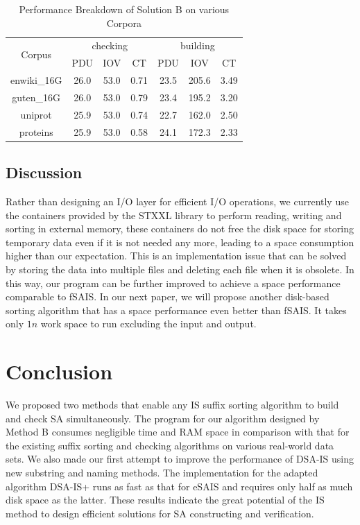 \documentclass[10pt,journal,compsoc]{IEEEtran}
\begin{document}
\begin{table}%
	\caption{Performance Breakdown of Solution B on various Corpora}
	\label{tbl:breakdown_solutionb}
	\centering
	\begin{tabular}{|c|c|c|c|c|c|c|}
		\hline
		\multirow{2}{*}{Corpus} & \multicolumn{3}{|c}{checking} & \multicolumn{3}{|c|}{building} \\\cline{2-7}
		& PDU & IOV & CT & PDU & IOV & CT \\\hline
		enwiki\_16G & 26.0 & 53.0 & 0.71 & 23.5 & 205.6 & 3.49 \\\hline
		guten\_16G & 26.0 & 53.0 & 0.79 & 23.4 & 195.2 & 3.20 \\\hline
		uniprot & 25.9 & 53.0 & 0.74 & 22.7 & 162.0 & 2.50 \\\hline
		proteins & 25.9 & 53.0 & 0.58 & 24.1 & 172.3 & 2.33 \\\hline
	\end{tabular}
\end{table}%

\subsection{Discussion}

Rather than designing an I/O layer for efficient I/O operations, we currently use the containers provided by the STXXL library to perform reading, writing and sorting in external memory, these containers do not free the disk space for storing temporary data even if it is not needed any more, leading to a space consumption higher than our expectation. This is an implementation issue that can be solved by storing the data into multiple files and deleting each file when it is obsolete. In this way, our program can be further improved to achieve a space performance comparable to fSAIS. In our next paper, we will propose another disk-based sorting algorithm that has a space performance even better than fSAIS. It takes only $1n$ work space to run excluding the input and output.

\section{Conclusion} \label{sec:conclusion}

We proposed two methods that enable any IS suffix sorting algorithm to build and check SA simultaneously. The program for our algorithm designed by Method B consumes negligible time and RAM space in comparison with that for the existing suffix sorting and checking algorithms on various real-world data sets. We also made our first attempt to improve the performance of DSA-IS using new substring and naming methods. The implementation for the adapted algorithm DSA-IS+ runs as fast as that for eSAIS and requires only half as much disk space as the latter. These results indicate the great potential of the IS method to design efficient solutions for SA constructing and verification. 




\end{document}
